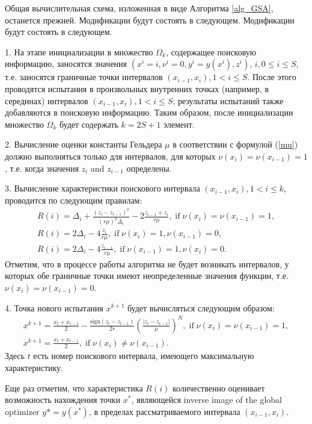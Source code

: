 \documentclass[preprint,12pt]{elsarticle}
\begin{document}
Общая вычислительная схема, изложенная в виде Алгоритма \ref{alg_GSA}, останется прежней. Модификации будут состоять в следующем.
Модификации будут состоять в следующем.

1. На этапе инициализации в множество $\Omega_k$, содержащее поисковую информацию, заносятся значения $(x^i = i, \nu^i=0, y^i=y(x^i), z^i)$, $ i, 0\leq i \leq S$, т.е. заносятся граничные точки интервалов $(x_{i-1},x_i), 1<i\leq S$.
После этого проводятся испытания в произвольных внутренних точках (например, в серединах) интервалов $(x_{i-1},x_i), 1<i\leq S$; результаты испытаний также добавляются в поисковую информацию. 
Таким образом, после инициализации множество $\Omega_k$ будет содержать $k=2S+1$ элемент.

2. Вычисление оценки константы Гельдера $\mu$ в соответствии с формулой (\ref{mu}) должно выполняться только для  интервалов, для которых $\nu(x_i) = \nu(x_{i-1}) = 1$, т.е. когда значения $z_i$ and $z_{i-1}$ определены.

3. Вычисление характеристики поискового интервала $(x_{i-1},x_i), 1<i\leq k$, проводится по следующим правилам:
\begin{gather}\label{R_int}
R(i) = \Delta_i + \frac{(z_i-z_{i-1})^2}{(r\mu)^2\Delta_i}-2\frac{z_{i-1}+z_i}{r\mu}, \; \mathrm{if} \; \nu(x_i) = \nu(x_{i-1}) = 1, \nonumber \\ 
R(i) = 2\Delta_i-4\frac{z_i}{r\mu}, \; \mathrm{if} \;  \nu(x_i) = 1, \nu(x_{i-1}) = 0, \nonumber \\ 
R(i) = 2\Delta_i-4\frac{z_{i-1}}{r\mu}, \; \mathrm{if} \;  \nu(x_{i-1}) = 1, \nu(x_{i}) = 0. \nonumber
\end{gather}
Отметим, что в процессе работы алгоритма не будет возникать интервалов, у которых обе граничные точки имеют неопределенные значения функции, т.е. $\nu(x_i) = \nu(x_{i-1}) = 0$.

4. Точка нового испытания $x^{k+1}$ будет вычисляться следующим образом:
\begin{gather}\label{xk1_int}
x^{k+1} = \frac{x_t+x_{t-1}}{2}- \frac{\mathrm{sign}(z_t-z_{t-1})}{2r} \left(\frac{\left|z_t-z_{t-1}\right|}{\mu}\right)^N, \; \mathrm{if} \; \nu(x_i) = \nu(x_{i-1}) = 1, \nonumber \\    
x^{k+1} = \frac{x_t+x_{t-1}}{2} , \; \mathrm{if} \; \nu(x_i) \neq \nu(x_{i-1}). \nonumber
\end{gather}
Здесь $t$ есть номер поискового интервала, имеющего максимальную характеристику.

Еще раз отметим, что характеристика $R(i)$ количественно оценивает возможность нахождения точки $x^*$, являющейся inverse image of the global optimizer $y* = y(x^*)$, в пределах рассматриваемого интервала $(x_{i-1},x_i)$.
\end{document}

